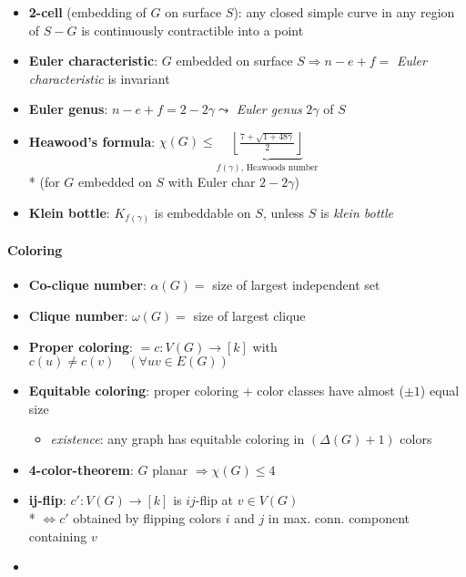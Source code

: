 \begin{itemize}
  \item \textbf{2-cell} (embedding of $ G $ on surface $ S $): any closed simple curve in any region of $ S - G $ is continuously contractible into a point
  \item \textbf{Euler characteristic}: $ G $ embedded on surface $ S \Rightarrow n - e + f = $ \emph{Euler characteristic} is invariant
  \item \textbf{Euler genus}: $ n - e + f = 2 - 2 \gamma \leadsto $ \emph{Euler genus} $ 2 \gamma $ of $ S $
  \item \textbf{Heawood's formula}: $ \chi(G) \leq \underbrace{\left\lfloor \frac{7 + \sqrt{1 + 48 \gamma}}{2} \right\rfloor}_{f(\gamma)\text{, Heawoods number}} $ \\* (for $ G $ embedded on $ S $ with Euler char $ 2-2\gamma $)
  \item \textbf{Klein bottle}: $ K_{f(\gamma)} $ is embeddable on $ S $, unless $ S $ is \emph{klein bottle}
\end{itemize}

\paragraph{Coloring}
\begin{itemize}
  \item \textbf{Co-clique number}: $ \alpha(G) = $ size of largest independent set
  \item \textbf{Clique number}: $ \omega(G) = $ size of largest clique
  \item \textbf{Proper coloring}: $ = c : V(G) \to [k] $ with $ c(u) \neq c(v) \quad (\forall uv \in E(G)) $
  \item \textbf{Equitable coloring}: proper coloring + color classes have almost ($ \pm 1 $) equal size
  \begin{itemize}
    \item \emph{existence}: any graph has equitable coloring in $ (\Delta(G) + 1) $ colors 
  \end{itemize}
  \item \textbf{4-color-theorem}: $ G $ planar $ \Rightarrow \chi(G) \leq 4 $ 
  \item \textbf{ij-flip}: $ c': V(G) \to [k] $ is $ ij $-flip at $ v \in V(G) $ \\*
    $ \Leftrightarrow c' $ obtained by flipping colors $ i $ and $ j $ in max. conn. component containing $ v $
  \item 
\end{itemize}

